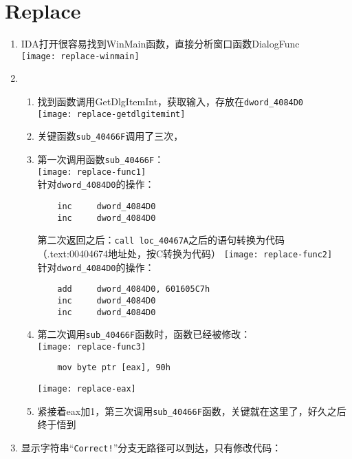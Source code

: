 \section{Replace}
\begin{enumerate}
\item IDA打开很容易找到WinMain函数，直接分析窗口函数DialogFunc\\
	\texttt{[image: replace-winmain]} \\
\item 
	\begin{enumerate}
	\item 找到函数调用GetDlgItemInt，获取输入，存放在\lstinline$dword_4084D0$\\
	\texttt{[image: replace-getdlgitemint]} \\
	\item 关键函数\lstinline$sub_40466F$调用了三次，\\
	\item 第一次调用函数\lstinline$sub_40466F$：\\
	\texttt{[image: replace-func1]} \\
	针对\lstinline$dword_4084D0$的操作：
	\begin{lstlisting}
	inc     dword_4084D0
	inc     dword_4084D0
	\end{lstlisting}
	第二次返回之后：\lstinline$call loc_40467A$之后的语句转换为代码（.text:00404674地址处，按C转换为代码）
	\texttt{[image: replace-func2]} \\
	针对\lstinline$dword_4084D0$的操作：
	\begin{lstlisting}
	add     dword_4084D0, 601605C7h
	inc     dword_4084D0
	inc     dword_4084D0
	\end{lstlisting}
	\item 第二次调用\lstinline$sub_40466F$函数时，函数已经被修改：\\
	\texttt{[image: replace-func3]} \\
	\begin{lstlisting}
	mov	byte ptr [eax], 90h
	\end{lstlisting}
	\texttt{[image: replace-eax]} \\
	\item 紧接着eax加1，第三次调用\lstinline$sub_40466F$函数，关键就在这里了，好久之后终于悟到\\
	\end{enumerate} 
\item 
	 显示字符串“\lstinline$Correct!$”分支无路径可以到达，只有修改代码：\\

\end{enumerate}
